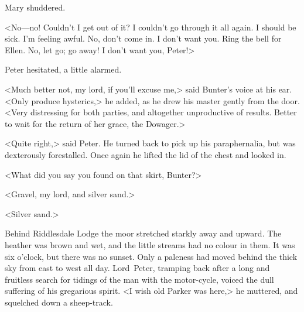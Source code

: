 Mary shuddered.

<No—no! Couldn't I get out of it? I couldn't go through it all again.  I should be sick. I'm feeling awful. No, don't come in. I don't want you. Ring the bell for Ellen. No, let go; go away! I don't want you, Peter!>

Peter hesitated, a little alarmed.

<Much better not, my lord, if you'll excuse me,> said Bunter's voice at his ear. <Only produce hysterics,> he added, as he drew his master gently from the door. <Very distressing for both parties, and altogether unproductive of results. Better to wait for the return of her grace, the Dowager.>

<Quite right,> said Peter. He turned back to pick up his paraphernalia, but was dexterously forestalled. Once again he lifted the lid of the chest and looked in.

<What did you say you found on that skirt, Bunter?>

<Gravel, my lord, and silver sand.>

<Silver sand.>

\divider

Behind Riddlesdale Lodge the moor stretched starkly away and upward.  The heather was brown and wet, and the little streams had no colour in them. It was six o'clock, but there was no sunset. Only a paleness had moved behind the thick sky from east to west all day. Lord~Peter, tramping back after a long and fruitless search for tidings of the man with the motor-cycle, voiced the dull suffering of his gregarious spirit. <I wish old Parker was here,> he muttered, and squelched down a sheep-track.

